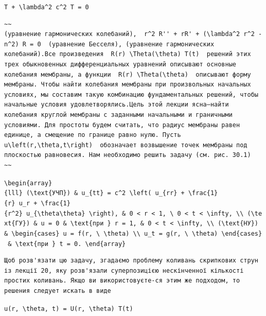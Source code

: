 \documentclass[
  ukrainian,
]{article}
\begin{document}
\texttt{T\textquotesingle{}\textquotesingle{}\ +\ \textbackslash{}lambda\^{}2\ c\^{}2\ T\ =\ 0}

\begin{verbatim}
~~
(уравнение гармонических колебаний),  r^2 R'' + rR' + (\lambda^2 r^2 - n^2) R = 0  (уравнение Бесселя), (уравнение гармонических колебаний).Все произведения  R(r) \Theta(\theta) T(t)  решений этих трех обыкновенных дифференциальных уравнений описывают основные колебания мембраны, а функции  R(r) \Theta(\theta)  описывают форму мембраны. Чтобы найти колебания мембраны при произвольных начальных условиях, мы составим такую комбинацию фундаментальных решений, чтобы начальные условия удовлетворялись.Цель этой лекции ясна—найти колебания круглой мембраны с заданными начальными и граничными условиями. Для простоты будем считать, что радиус мембраны равен единице, а смещение по границе равно нулю. Пусть  u\left(r,\theta,t\right)  обозначает возвышение точек мембраны под плоскостью равновесия. Нам необходимо решить задачу (см. рис. 30.1)
~~
\end{verbatim}

\texttt{\textbackslash{}begin\{array\}\{lll\}\ (\textbackslash{}text\{УЧП\})\ \&\ u\_\{tt\}\ =\ c\^{}2\ \textbackslash{}left(\ u\_\{rr\}\ +\ \textbackslash{}frac\{1\}\{r\}\ u\_r\ +\ \textbackslash{}frac\{1\}\{r\^{}2\}\ u\_\{\textbackslash{}theta\textbackslash{}theta\}\ \textbackslash{}right),\ \&\ 0\ \textless{}\ r\ \textless{}\ 1,\ \textbackslash{}\ 0\ \textless{}\ t\ \textless{}\ \textbackslash{}infty,\ \textbackslash{}\textbackslash{}\ (\textbackslash{}text\{ГУ\})\ \&\ u\ =\ 0\ \&\ \textbackslash{}text\{при\ \}\ r\ =\ 1,\ \&\ 0\ \textless{}\ t\ \textless{}\ \textbackslash{}infty,\ \textbackslash{}\textbackslash{}\ (\textbackslash{}text\{НУ\})\ \&\ \textbackslash{}begin\{cases\}\ u\ =\ f(r,\ \textbackslash{}\ \textbackslash{}theta)\ \textbackslash{}\textbackslash{}\ u\_t\ =\ g(r,\ \textbackslash{}\ \textbackslash{}theta)\ \textbackslash{}end\{cases\}\ \&\ \textbackslash{}text\{при\ \}\ t\ =\ 0.\ \textbackslash{}end\{array\}}

\begin{verbatim}
Щоб розв'язати цю задачу, згадаємо проблему коливань скрипкових струн із лекції 20, яку розв'язали суперпозицією нескінченної кількості простих коливань. Якщо ви використовуєте-ся этим же подходом, то решения следует искать в виде
\end{verbatim}

\texttt{u(r,\ \textbackslash{}theta,\ t)\ =\ U(r,\ \textbackslash{}theta)\ T(t)}
\end{document}
